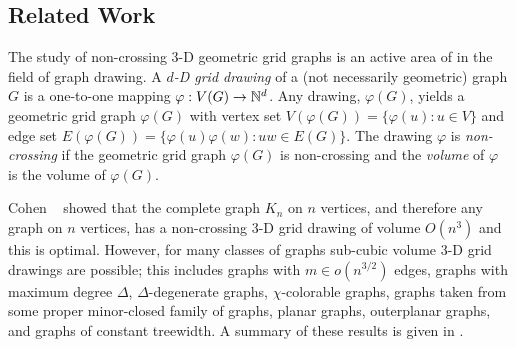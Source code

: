 \documentclass{patmorin}
\begin{document}
\subsection{Related Work}

The study of non-crossing 3-D geometric grid graphs is an
active area of in the field of graph drawing.  A \emph{$d$-D
grid drawing} of a (not necessarily geometric) graph $G$ is a
one-to-one mapping $\varphi:V(G)\rightarrow \mathbb{N}^d$.  Any drawing,
$\varphi(G)$, yields a geometric grid graph $\varphi(G)$ with
vertex set $V(\varphi(G))=\{\varphi(u):u\in V\}$ and edge set
$E(\varphi(G))=\{\varphi(u)\varphi(w):uw\in E(G)\}$.  The drawing
$\varphi$ is \emph{non-crossing} if the geometric grid graph $\varphi(G)$
is non-crossing and the \emph{volume} of $\varphi$ is the volume of
$\varphi(G)$.

Cohen \etal~\cite{cohen.eades.ea:three-dimensional} showed that the
complete graph $K_n$ on $n$ vertices, and therefore any graph on $n$
vertices, has a non-crossing 3-D grid drawing of volume $O(n^3)$ and this
is optimal.  However, for many classes of graphs sub-cubic volume 3-D
grid drawings are possible; this includes graphs with $m\in o(n^{3/2})$
edges, graphs with maximum degree $\Delta$, $\Delta$-degenerate graphs,
$\chi$-colorable graphs, graphs taken from some proper minor-closed family
of graphs, planar graphs, outerplanar graphs, and graphs of constant
treewidth.  A summary of these results is given in .
\end{document}

